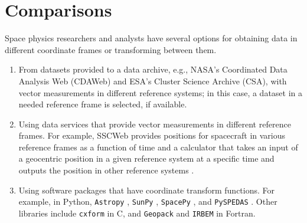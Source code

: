 \documentclass[draft]{agujournal2019}
\begin{document}
\begin{itemize}

     


\end{itemize}


\section{Comparisons}
\label{sect:comparisons}

Space physics researchers and analysts have several options for obtaining data in different coordinate frames or transforming between them.

\begin{enumerate}

    \parskip 0.1in 

    \item From datasets provided to a data archive, e.g., NASA's Coordinated Data Analysis Web (CDAWeb) and ESA's Cluster Science Archive (CSA), with vector measurements in different reference systems; in this case, a dataset in a needed reference frame is selected, if available.

    \item Using data services that provide vector measurements in different reference frames. For example, SSCWeb provides positions for spacecraft in various reference frames as a function of time \cite{SSCWeb} and a calculator that takes an input of a geocentric position in a given reference system at a specific time and outputs the position in other reference systems \cite{SSCWebCoordinateCalculator}.

    \item Using software packages that have coordinate transform functions. For example, in Python, \texttt{Astropy} \cite{AstroPy2022}, \texttt{SunPy} \cite{SunPy}, \texttt{SpacePy} \cite{SpacePy}, and \texttt{PySPEDAS} \cite{Angelopoulos2024}. Other libraries include \texttt{cxform} \cite{cxform} in C, and \texttt{Geopack} \cite{Tsyganenko2008} and \texttt{IRBEM} \cite{IRBEM2022} in Fortran.

\end{enumerate}
\end{document}
